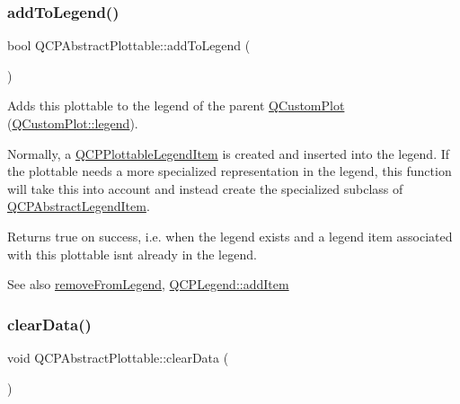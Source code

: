 \subsubsection{\texorpdfstring{add\+To\+Legend()}{addToLegend()}}
{\footnotesize\ttfamily bool Q\+C\+P\+Abstract\+Plottable\+::add\+To\+Legend (\begin{DoxyParamCaption}{ }\end{DoxyParamCaption})\hspace{0.3cm}{\ttfamily [virtual]}}

Adds this plottable to the legend of the parent \mbox{\hyperlink{class_q_custom_plot}{Q\+Custom\+Plot}} (\mbox{\hyperlink{class_q_custom_plot_a4eadcd237dc6a09938b68b16877fa6af}{Q\+Custom\+Plot\+::legend}}).

Normally, a \mbox{\hyperlink{class_q_c_p_plottable_legend_item}{Q\+C\+P\+Plottable\+Legend\+Item}} is created and inserted into the legend. If the plottable needs a more specialized representation in the legend, this function will take this into account and instead create the specialized subclass of \mbox{\hyperlink{class_q_c_p_abstract_legend_item}{Q\+C\+P\+Abstract\+Legend\+Item}}.

Returns true on success, i.\+e. when the legend exists and a legend item associated with this plottable isn\textquotesingle{}t already in the legend.

\begin{DoxySeeAlso}{See also}
\mbox{\hyperlink{class_q_c_p_abstract_plottable_ac95fb2604d9106d0852ad9ceb326fe8c}{remove\+From\+Legend}}, \mbox{\hyperlink{class_q_c_p_legend_a3ab274de52d2951faea45a6d975e6b3f}{Q\+C\+P\+Legend\+::add\+Item}} 
\end{DoxySeeAlso}
\mbox{\label{class_q_c_p_abstract_plottable_a86e5b8fd4b6ff4f4084e7ea4c573fc53}} 
\subsubsection{\texorpdfstring{clear\+Data()}{clearData()}}
{\footnotesize\ttfamily void Q\+C\+P\+Abstract\+Plottable\+::clear\+Data (\begin{DoxyParamCaption}{ }\end{DoxyParamCaption})\hspace{0.3cm}{\ttfamily [pure virtual]}}

